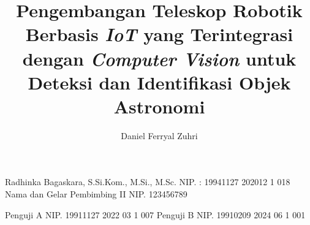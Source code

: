 \documentclass[article]{report} %
\begin{document}

    
    \title{Pengembangan Teleskop Robotik Berbasis \textit{IoT} yang Terintegrasi dengan \textit{Computer Vision} untuk Deteksi dan Identifikasi Objek Astronomi} %
    
    \author{Daniel Ferryal Zuhri}		%
	
	\dosbingA%
		{Radhinka Bagaskara, S.Si.Kom., M.Si., M.Sc.}%
		{NIP. : 19941127 202012 1 018}				%
	\dosbingB%
		{Nama dan Gelar Pembimbing II}%
		{NIP. 123456789}				%
		
	\pengujiA%
		{Penguji A}%
		{NIP. 19911127 2022 03 1 007}				%
	\pengujiB%
		{Penguji B}%
		{NIP. 19910209 2024 06 1 001}				%

	\sloppy %
    \setcounter{page}{1} %

    \clearpage
    \pagestyle{alternatingstyle}
    
%    
%   

    \tableofcontents
    \pagebreak
    \listoftables
    \pagebreak
    \listoffigures
    \pagebreak
    \listofmyequations
%    
    \lstlistoflistings
    \pagebreak
    
\end{document}
